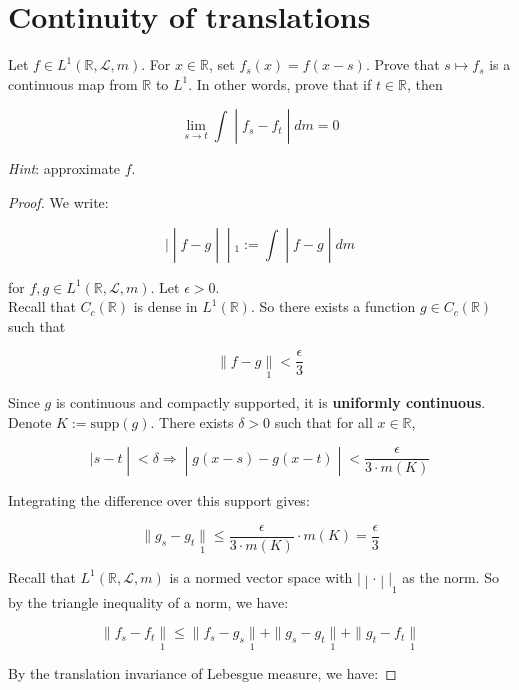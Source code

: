\documentclass{qlnotes-export}
\begin{document}
\section{Continuity of translations}\label{continuity-of-translations}

Let \(f \in L^{1}({\mathbb{R}},\mathcal{L},m)\). For \(x \in {\mathbb{R}}\), set \(f_{s}(x) = f(x - s)\). Prove that \(s\mapsto f_{s}\) is a continuous map from \(\mathbb{R}\) to \(L^{1}\). In other words, prove that if \(t \in {\mathbb{R}}\), then

\[\left. \lim\limits_{s\rightarrow t}\int \middle| f_{s} - f_{t} \middle| dm = 0 \right.\]

\emph{Hint}: approximate \(f\).

\begin{proof}

We write:

\[\left. | \middle| f - g \middle| \middle| {}_{1} := \int \middle| f - g \middle| dm \right.\]

for \(f,g \in L^{1}({\mathbb{R}},\mathcal{L},m)\). Let \(\epsilon > 0\).\\
Recall that \(C_{c}({\mathbb{R}})\) is dense in \(L^{1}({\mathbb{R}})\). So there exists a function \(g \in C_{c}({\mathbb{R}})\) such that

\[\parallel f - g\underset{1}{\parallel} < \frac{\epsilon}{3}\]

Since \(g\) is continuous and compactly supported, it is \textbf{uniformly continuous}. Denote \(K := \text{supp}(g)\). There exists \(\delta > 0\) such that for all \(x \in {\mathbb{R}}\),

\[\left. |s - t \middle| < \delta\Longrightarrow \middle| g(x - s) - g(x - t) \middle| < \frac{\epsilon}{3 \cdot m(K)} \right.\]

Integrating the difference over this support gives:

\[\parallel g_{s} - g_{t}\underset{1}{\parallel} \leq \frac{\epsilon}{3 \cdot m(K)} \cdot m(K) = \frac{\epsilon}{3}\]

Recall that \(L^{1}({\mathbb{R}},\mathcal{L},m)\) is a normed vector space with \(\left. | \middle| \cdot \middle| |_{1} \right.\) as the norm. So by the triangle inequality of a norm, we have:

\[\parallel f_{s} - f_{t}\underset{1}{\parallel} \leq \parallel f_{s} - g_{s}\underset{1}{\parallel} + \parallel g_{s} - g_{t}\underset{1}{\parallel} + \parallel g_{t} - f_{t}\underset{1}{\parallel}\]

By the translation invariance of Lebesgue measure, we have:


\end{proof}
\end{document}
